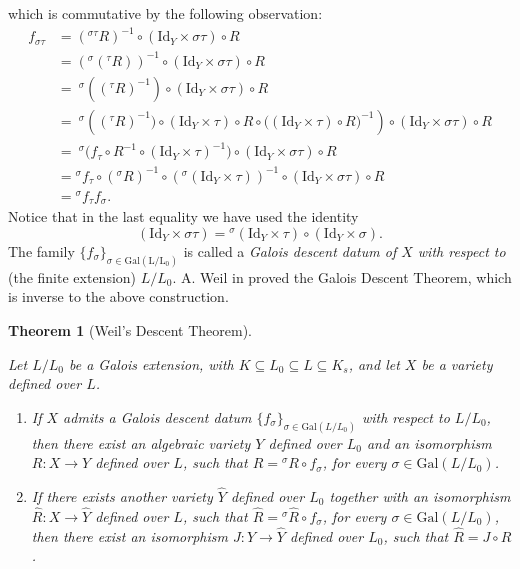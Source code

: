 \documentclass[10pt]{amsart}
\newtheorem{theorem}{Theorem}
\theoremstyle{definition}
\newcommand{\Gal}{{ \mathrm{Gal}}}
\begin{document}
which is commutative by the following observation:
\begin{align*}
  f_{\sigma \tau }
  &= ({^{ \sigma \tau} \! R})^{-1} \circ
  (\mathrm{Id}_Y \times \sigma\tau) \circ  R
   \\ 
   &= ( ^{\sigma}\! ( {^\tau \!  R}) )^{-1} \circ (\mathrm{Id}_Y \times \sigma\tau) \circ R \\
   &= \ ^{\sigma} \! \left( (^{\tau}R)^{-1} \right) \circ(\mathrm{Id}_Y \times \sigma\tau) \circ R 
   \\   
   &=  
  \ ^{\sigma}\!\!\left( ( ^\tau \!R)^{-1})  \circ (\mathrm{Id}_Y \times \tau) \circ R \circ
   \big( (\mathrm{Id}_Y \times \tau) \circ R\big)^{-1} \right) \circ
   (\mathrm{Id}_Y \times \sigma\tau) \circ
   R 
  \\
   &= \  ^{\sigma} \!\big(f_{\tau} \circ R^{-1} \circ (\mathrm{Id}_Y \times \tau)^{-1} \big) \circ (\mathrm{Id}_Y \times \sigma\tau) \circ R 
   \\
   &=   {^{\sigma} \!f}_\tau  \circ  ({^{\sigma}}\!R)^{-1} \circ ({^{\sigma}}\!(\mathrm{Id}_Y \times \tau))^{-1} \circ (\mathrm{Id}_Y \times \sigma\tau) \circ R 
   \\
   & ={^{\sigma} \!f}_\tau f_\sigma. 
\end{align*} 
Notice that in the last equality we have used the identity 
\[
  (\mathrm{Id}_Y \times \sigma\tau)= {^\sigma \!(\mathrm{Id}_Y \times \tau) } \circ (\mathrm{Id}_Y \times \sigma).
\]
The family $\{f_\sigma\}_{\sigma \in \mathrm{Gal(L/L_0)}}$ is called a {\em Galois descent datum of $X$ with respect to} (the finite extension) $L/L_0$.
A. Weil in \cite{Weil56} proved the Galois Descent Theorem, which is inverse to the above construction.
\begin{theorem}[Weil's Descent Theorem]\label{thm:weil's descent}

Let $L/L_0$ be a Galois extension, with $K \subseteq L_0 \subseteq L \subseteq K_s$, and let $X$ be a variety defined over $L$.
\begin{enumerate}
  \item 
 If $X$ admits a Galois descent datum $\{f_\sigma\}_{\sigma \in \Gal(L/L_0)}$ with respect to $L/L_0$, then there exist an algebraic variety $Y$ defined over $L_0$ and an isomorphism $R:X \rightarrow Y$ defined over $L$, such that $R= {^\sigma \! R}\circ f_\sigma$, for every $\sigma \in \Gal(L/L_0)$. 
 \item If there exists another variety $\widehat{Y}$ defined over $L_0$ together with an isomorphism $\widehat{R}\colon X \rightarrow \widehat{Y}$ defined over $L$, such that $\widehat{R}= {^\sigma\!\widehat{R}} \circ f_\sigma$, for every $\sigma \in \Gal(L/L_0)$, then there exist an isomorphism $J:Y \rightarrow \widehat{Y}$ defined over $L_0$, such that $\widehat{R}=J \circ R$.
 \end{enumerate} 
\end{theorem}
\end{document}
